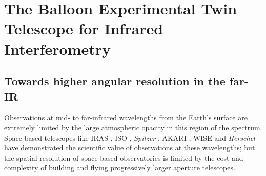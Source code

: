 %
%
%
%
%
%
%
%
%
%

\section{The Balloon Experimental Twin Telescope for Infrared Interferometry}

\subsection{Towards higher angular resolution in the far-IR}
Observations at mid- to far-infrared wavelengths from the Earth's surface are extremely 
limited by the large atmospheric opacity in this region of the spectrum. Space-based telescopes 
like IRAS \citep[12-100 \um;][]{1984ApJ...278L...1N}, ISO \citep[2.5-240 $\um$;][]{1996A&A...315L..27K}, \textit{Spitzer} \citep[3.6-160 $\um$;][]{2004ApJS..154....1W}, AKARI  \citep[1.7-180 $\um$;][]{2007PASJ...59S.369M}, WISE \citep[3.4-22 $\um$;][]{2010AJ....140.1868W} and \textit{Herschel} \citep[55-672 $\um$;][]{2010A&A...518L...1P} have demonstrated the scientific value of observations at 
these wavelengths; but the spatial resolution of space-based observatories is limited by the cost 
and complexity of building and flying progressively larger aperture telescopes. 

